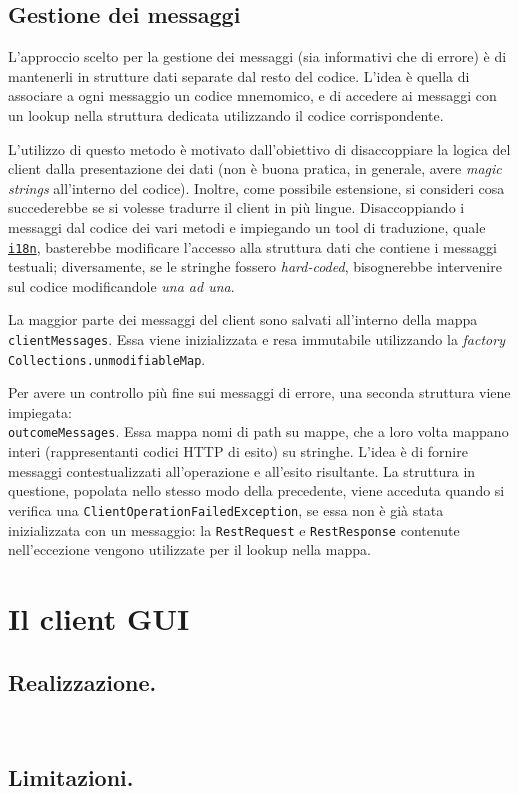\documentclass[a4paper,8pt]{article} %
\def\code#1{\texttt{#1}}
\begin{document}
\subsection{Gestione dei messaggi}
\label{sec:err_handling}
L'approccio scelto per la gestione dei messaggi (sia informativi che di errore) è di mantenerli in strutture dati separate dal resto del codice.
L'idea è quella di associare a ogni messaggio un codice mnemomico, e di accedere ai messaggi con un lookup nella struttura dedicata utilizzando il codice corrispondente.
\par L'utilizzo di questo metodo è motivato dall'obiettivo di disaccoppiare la logica del client dalla presentazione dei dati (non è buona pratica, in generale, avere \emph{magic strings} all'interno del codice). Inoltre,
come possibile estensione, si consideri cosa succederebbe se si volesse tradurre il client in più lingue. Disaccoppiando i messaggi dal codice dei vari metodi e impiegando un tool di traduzione, quale \href{https://docs.oracle.com/javase/8/docs/technotes/guides/intl/index.html}{\code{i18n}},
basterebbe modificare l'accesso alla struttura dati che contiene i messaggi testuali; diversamente, se le stringhe fossero \emph{hard-coded}, bisognerebbe intervenire sul codice modificandole \emph{una ad una}.
\par La maggior parte dei messaggi del client sono salvati all'interno della mappa \code{clientMessages}. Essa viene inizializzata e resa immutabile utilizzando la \emph{factory} \code{Collections.unmodifiableMap}.
\par Per avere un controllo più fine sui messaggi di errore, una seconda struttura viene impiegata: \\ \code{outcomeMessages}. Essa mappa nomi di path su mappe, che a loro volta mappano interi
(rappresentanti codici HTTP di esito) su stringhe. L'idea è di fornire messaggi contestualizzati all'operazione e all'esito risultante.
La struttura in questione, popolata nello stesso modo della precedente, viene acceduta quando si verifica una \code{ClientOperationFailedException}, se essa non è già stata inizializzata con un messaggio: la \code{RestRequest} e \code{RestResponse} contenute nell'eccezione vengono utilizzate per il lookup nella mappa.

\section{Il client GUI}

\subsection{Realizzazione.}\quad \\
\subsection{Limitazioni.}\quad \\
\end{document}
